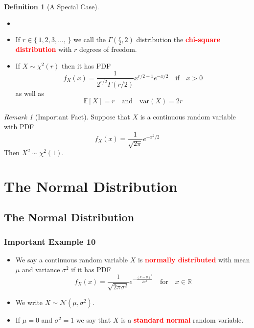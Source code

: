 \documentclass{article}
\newcommand{\R}{\mathbb{R}}
\newcommand{\E}{\mathbb{E}}
\newcommand{\var}{\text{var}}
\newcommand{\bfred}[1]{\textcolor{red}{\textbf{#1}}}
\theoremstyle{plain}
\theoremstyle{definition}
\newtheorem{defn}{Definition}[section]
\theoremstyle{remark}
\newtheorem*{rem}{Remark}
\begin{document}
\begin{defn}[A Special Case]
    \begin{itemize}
        \item []
        \item If $r \in \{\,1,2,3,\dotsc,\,\}$ we call the $\Gamma(\frac{r}{2},2)$ distribution the \bfred{chi-square distribution} with $r$ degrees of freedom.
        \item If $X\sim\chi^2(r)$ then it has PDF \[f_X(x)=\frac{1}{2^{r/2}\Gamma(r/2)}x^{r/2-1}e^{-x/2} \quad \text{if} \quad x>0\] as well as \[\E[X]=r \quad \text{and} \quad \var(X)=2r\]
    \end{itemize}
\end{defn}

\begin{rem}[Important Fact]
    Suppose that $X$ is a continuous random variable with PDF \[f_X(x)=\frac{1}{\sqrt{2\pi}}e^{-x^2/2}\] Then $X^2\sim\chi^2(1)$.
\end{rem}

\section{The Normal Distribution}

\subsection{The Normal Distribution}

\subsubsection*{Important Example 10}

\begin{tcolorbox}[title = Normal Distribution, colback = SkyBlue!5!white,colframe = SkyBlue!75!black]
    \begin{itemize}
        \item We say a continuous random variable $X$ is \bfred{normally distributed} with mean $\mu$ and variance $\sigma^2$ if it has PDF \[f_X(x)=\frac{1}{\sqrt{2\pi\sigma^2}}e^{-\frac{(x-\mu)^2}{2\sigma^2}} \quad \text{for} \quad x\in\R\]
        \item We write $X\sim\mathcal{N}(\mu,\sigma^2)$.
        \item If $\mu=0$ and $\sigma^2=1$ we say that $X$ is a \bfred{standard normal} random variable.
    \end{itemize}
\end{tcolorbox}
\end{document}
